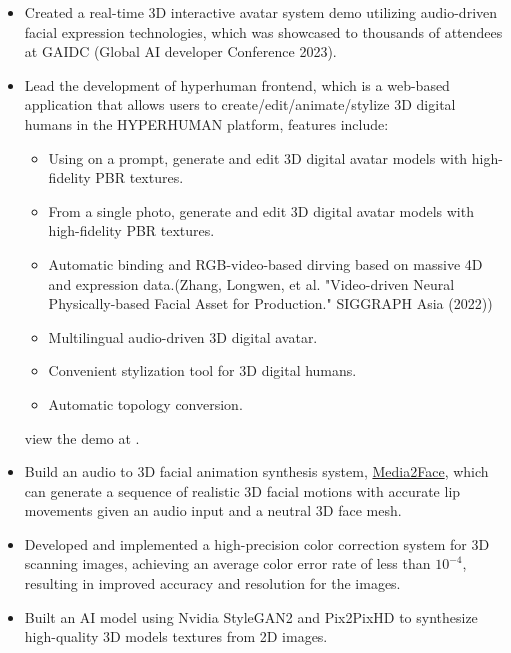 \documentclass{resume}
\begin{document}
\begin{itemize}
  \item Created a real-time 3D interactive avatar system demo utilizing audio-driven facial expression technologies, which was showcased to thousands of attendees at GAIDC (Global AI developer Conference 2023).
  \item Lead the development of hyperhuman frontend, which is a web-based application that allows users to create/edit/animate/stylize 3D digital humans in the HYPERHUMAN platform, features include:
        \begin{itemize}
          \item Using on a prompt, generate and edit 3D digital avatar models with high-fidelity PBR textures.
          \item From a single photo, generate and edit 3D digital avatar models with high-fidelity PBR textures.
          \item Automatic binding and RGB-video-based dirving based on massive 4D and expression data.(Zhang, Longwen, et al. "Video-driven Neural Physically-based Facial Asset for Production." SIGGRAPH Asia (2022))
          \item Multilingual audio-driven 3D digital avatar.
          \item Convenient stylization tool for 3D digital humans.
          \item Automatic topology conversion.
        \end{itemize}
        view the demo at .
\end{itemize}


\begin{itemize}
  \item Build an audio to 3D facial animation synthesis system, \href{https://arxiv.org/abs/2401.15687}{Media2Face}, which can generate a sequence of realistic 3D facial motions with accurate lip movements given an audio input and a neutral 3D face mesh.
  \item Developed and implemented a high-precision color correction system for 3D scanning images, achieving an average color error rate of less than $10^{-4}$, resulting in improved accuracy and resolution for the images.
  \item Built an AI model using Nvidia StyleGAN2 and Pix2PixHD to synthesize high-quality 3D models textures from 2D images.
\end{itemize}
\end{document}
